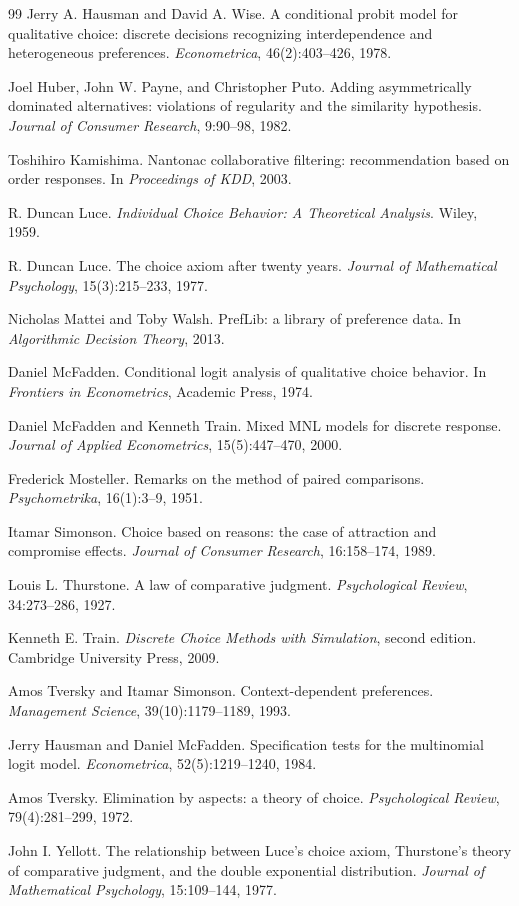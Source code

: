 \documentclass[11pt]{article}
\begin{document}
\begin{thebibliography}{99}
Jerry A. Hausman and David A. Wise.
A conditional probit model for qualitative choice: discrete decisions recognizing
interdependence and heterogeneous preferences.
\emph{Econometrica}, 46(2):403--426, 1978.

Joel Huber, John W. Payne, and Christopher Puto.
Adding asymmetrically dominated alternatives: violations of regularity and the
similarity hypothesis.
\emph{Journal of Consumer Research}, 9:90--98, 1982.

Toshihiro Kamishima.
Nantonac collaborative filtering: recommendation based on order responses.
In \emph{Proceedings of KDD}, 2003.

R. Duncan Luce.
\emph{Individual Choice Behavior: A Theoretical Analysis}.
Wiley, 1959.

R. Duncan Luce.
The choice axiom after twenty years.
\emph{Journal of Mathematical Psychology}, 15(3):215--233, 1977.

Nicholas Mattei and Toby Walsh.
PrefLib: a library of preference data.
In \emph{Algorithmic Decision Theory}, 2013.

Daniel McFadden.
Conditional logit analysis of qualitative choice behavior.
In \emph{Frontiers in Econometrics}, Academic Press, 1974.

Daniel McFadden and Kenneth Train.
Mixed MNL models for discrete response.
\emph{Journal of Applied Econometrics}, 15(5):447--470, 2000.

Frederick Mosteller.
Remarks on the method of paired comparisons.
\emph{Psychometrika}, 16(1):3--9, 1951.

Itamar Simonson.
Choice based on reasons: the case of attraction and compromise effects.
\emph{Journal of Consumer Research}, 16:158--174, 1989.

Louis L. Thurstone.
A law of comparative judgment.
\emph{Psychological Review}, 34:273--286, 1927.

Kenneth E. Train.
\emph{Discrete Choice Methods with Simulation}, second edition.
Cambridge University Press, 2009.

Amos Tversky and Itamar Simonson.
Context-dependent preferences.
\emph{Management Science}, 39(10):1179--1189, 1993.

Jerry Hausman and Daniel McFadden.
Specification tests for the multinomial logit model.
\emph{Econometrica}, 52(5):1219--1240, 1984.

Amos Tversky.
Elimination by aspects: a theory of choice.
\emph{Psychological Review}, 79(4):281--299, 1972.

John I. Yellott.
The relationship between Luce's choice axiom, Thurstone's theory of comparative
judgment, and the double exponential distribution.
\emph{Journal of Mathematical Psychology}, 15:109--144, 1977.

\end{thebibliography}
\end{document}
